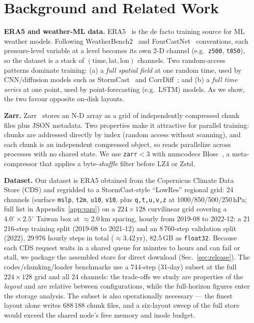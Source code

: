 \documentclass[conference]{IEEEtran}
\begin{document}
\section{Background and Related Work}
\textbf{ERA5 and weather-ML data.} ERA5~\cite{era5} is the de facto training
source for ML weather models. Following WeatherBench2~\cite{wb2} and
FourCastNet~\cite{fcn} conventions, each pressure-level variable at a level
becomes its own 2-D channel (e.g.\ \texttt{z500}, \texttt{t850}), so the
dataset is a stack of $(\textrm{time},\textrm{lat},\textrm{lon})$ channels.
Two random-access patterns dominate training: (a) a \emph{full spatial field}
at one random time, used by CNN/diffusion models such as
StormCast~\cite{stormcast} and CorrDiff~\cite{corrdiff}; and (b) a \emph{full
time series} at one point, used by point-forecasting (e.g.\ LSTM) models. As
we show, the two favour opposite on-disk layouts.

\textbf{Zarr.} Zarr~\cite{zarr} stores an N-D array as a grid of
independently compressed chunk files plus JSON metadata. Two properties make
it attractive for parallel training: chunks are addressed directly by index
(random access without scanning), and each chunk is an independent compressed
object, so reads parallelize across processes with no shared state. We use
\texttt{zarr}$<$3 with numcodecs Blosc~\cite{blosc}, a meta-compressor that
applies a byte-\emph{shuffle} filter before LZ4 or Zstd.

\textbf{Dataset.} Our dataset is ERA5 obtained from the Copernicus Climate
Data Store (CDS) and regridded to a StormCast-style ``LowRes'' regional grid:
24 channels (surface \texttt{mslp}, \texttt{t2m}, \texttt{u10}, \texttt{v10},
plus \texttt{q,t,u,v,z} at 1000/850/500/250\,hPa; full list in
Appendix~\ref{app:vars}) on a $224\times128$
curvilinear grid covering a $4.0^\circ\times2.5^\circ$ Taiwan box at
$\approx$2.0\,km spacing, hourly from 2019-08 to 2022-12: a 21\,216-step
training split (2019-08 to 2021-12) and an 8\,760-step validation split
(2022), 29\,976 hourly steps in total ($\approx$3.42\,yr), 82.5\,GB as
\texttt{float32}. Because each CDS request waits in a shared queue for minutes
to hours and can fail or stall, we package the assembled store for direct
download (Sec.~\ref{sec:release}). The codec/chunking/loader benchmarks use a
744-step (31-day) subset at the full $224\times128$ grid and all 24 channels:
the trade-offs we study are properties of the \emph{layout} and are relative
between configurations, while the full-horizon figures enter the storage
analysis. The subset is also operationally necessary --- the finest layout
alone writes 688\,188 chunk files, and a six-layout sweep of the full store
would exceed the shared node's free memory and inode budget.
\end{document}

